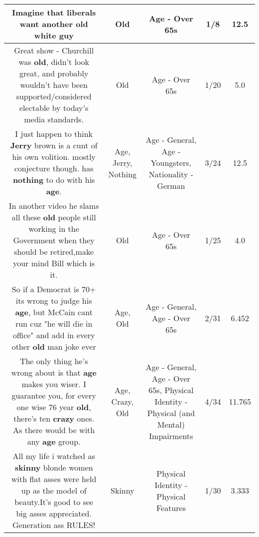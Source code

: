 \documentclass[11pt]{article}
\newlength\mylength
\begin{document}
\begin{center}
\begin{longtable}{|C{.65\mylength}|C{.30\mylength}|C{.12\mylength}|C{.12\mylength}|C{.12\mylength}|}
  \small Imagine that liberals want another \textbf{old} white guy\normalsize   & Old & Age - Over 65s & 1/8 & 12.5 \\  \hline
  \small Great show - Churchill was \textbf{old}, didn't look great, and probably wouldn't have been supported/considered electable by today's media standards.\normalsize   & Old & Age - Over 65s & 1/20 & 5.0 \\  \hline
  \small I just happen to think \textbf{Jerry} brown is a cunt of his own volition. mostly conjecture though. has \textbf{nothing} to do with his \textbf{age}.\normalsize   & Age, Jerry, Nothing & Age - General, Age - Youngsters, Nationality - German & 3/24 & 12.5 \\  \hline
  \small In another video he slams all these \textbf{old} people still working in the Government when they should be retired,make your mind Bill which is it.\normalsize   & Old & Age - Over 65s & 1/25 & 4.0 \\  \hline
  \small So if a Democrat is 70+ its wrong to judge his \textbf{age}, but McCain cant run cuz "he will die in office" and add in every other \textbf{old} man joke ever\normalsize   & Age, Old & Age - General, Age - Over 65s & 2/31 & 6.452 \\  \hline
  \small The only thing he's wrong about is that \textbf{age} makes you wiser. I guarantee you, for every one wise 76 year \textbf{old}, there's ten \textbf{crazy} ones. As there would be with any \textbf{age} group.\normalsize   & Age, Crazy, Old & Age - General, Age - Over 65s, Physical Identity - Physical (and Mental) Impairments & 4/34 & 11.765 \\  \hline
  \small All my life i watched as \textbf{skinny} blonde women with flat asses were held up as the model of beauty.It's good to see big asses appreciated. Generation ass RULES!\normalsize   & Skinny & Physical Identity - Physical Features & 1/30 & 3.333 \\  \hline

\end{longtable}
\end{center}
\end{document}
